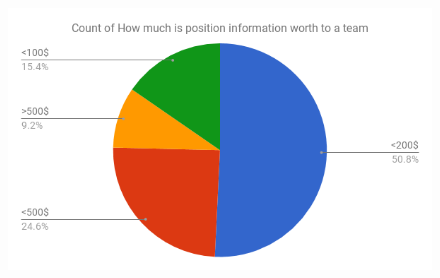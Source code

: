 \documentclass{article}
\begin{document}
  \begin{figure}[H]
    \centering
    \includegraphics[width=1\linewidth]{./survey_worth.png}
    \label{fig:survey_worth}
  \end{figure}




\end{document}
